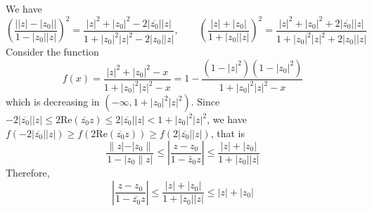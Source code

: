 We have
\[
\left( \frac{\lvert \lvert z \rvert -\lvert z_{0} \rvert  \rvert }{1-\lvert z_{0} \rvert \lvert z \rvert } \right)^{2}=\frac{\lvert z \rvert ^{2}+\lvert z_{0} \rvert ^{2}-2\lvert \overline{z_{0}} \rvert \lvert z \rvert }{1+\lvert z_{0} \rvert ^{2}\lvert z \rvert ^{2}-2\lvert z_{0} \rvert \lvert z \rvert },\qquad \left( \frac{\lvert z \rvert +\lvert z_{0} \rvert }{1+\lvert z_{0} \rvert \lvert z \rvert } \right)^{2}=\frac{\lvert z \rvert ^{2}+\lvert z_{0} \rvert ^{2}+2\lvert \overline{z_{0}} \rvert \lvert z \rvert }{1+\lvert z_{0} \rvert ^{2}\lvert z \rvert ^{2}+2\lvert z_{0} \rvert \lvert z \rvert }
\]
Consider the function
\[
f(x)=\frac{\lvert z \rvert ^{2}+\lvert z_{0} \rvert ^{2}-x}{1+\lvert z_{0} \rvert ^{2}\lvert z \rvert ^{2}-x}=1-\frac{(1-\lvert z \rvert ^{2})(1-\lvert z_{0} \rvert ^{2})}{1+\lvert z_{0} \rvert ^{2}\lvert z \rvert ^{2}-x}
\]
which is decreasing in $(-\infty,1+\lvert z_{0} \rvert ^{2}\lvert z \rvert ^{2})$. Since $-2\lvert \overline{z_{0}} \rvert \lvert z \rvert\leq 2\mathrm{Re}(\overline{z_{0}}z)\leq 2\lvert \overline{z_{0}} \rvert \lvert z \rvert<1+\lvert z_{0} \rvert ^{2}\lvert z \rvert ^{2}$, we have $f(-2\lvert \overline{z_{0}} \rvert \lvert z \rvert)\geq f(2\mathrm{Re}(\overline{z_{0}}z))\geq f(2\lvert \overline{z_{0}} \rvert \lvert z \rvert)$, that is
\[
\frac{\left\|z|-| z_0\right\|}{1-\left|z_0 \| z\right|} \leqslant\left|\frac{z-z_0}{1-\bar{z}_0 z}\right| \leqslant \frac{|z|+\left|z_0\right|}{1+\left|z_0\right||z|}
\]
Therefore,
\[
\left\lvert  \frac{z-z_{0}}{1-\overline{z_{0}}z}  \right\rvert \leq \frac{\lvert z \rvert +\lvert z_{0} \rvert }{1+\lvert z_{0} \rvert \lvert z \rvert }\leq \lvert z \rvert +\lvert z_{0} \rvert
\]